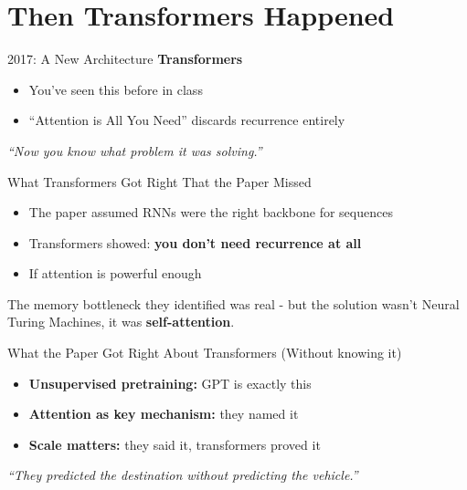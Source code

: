 \section{Then Transformers Happened}

\begin{frame}{2017: A New Architecture}
    \textbf{Transformers}
    
    \vspace{1em}
    \begin{itemize}
        \item You've seen this before in class
        \item ``Attention is All You Need'' discards recurrence entirely
    \end{itemize}
    
    \vspace{1em}
    \textit{``Now you know what problem it was solving.''}
\end{frame}

\begin{frame}{What Transformers Got Right That the Paper Missed}
    \begin{itemize}
        \item The paper assumed RNNs were the right backbone for sequences
        \item Transformers showed: \textbf{you don't need recurrence at all}
        \item If attention is powerful enough
    \end{itemize}
    
    \vspace{1em}
    The memory bottleneck they identified was real - but the solution wasn't Neural Turing Machines, it was \textbf{self-attention}.
\end{frame}

\begin{frame}{What the Paper Got Right About Transformers}
    (Without knowing it)
    
    \vspace{1em}
    \begin{itemize}
        \item \textbf{Unsupervised pretraining:} GPT is exactly this
        \item \textbf{Attention as key mechanism:} they named it
        \item \textbf{Scale matters:} they said it, transformers proved it
    \end{itemize}
    
    \vspace{1em}
    \textit{``They predicted the destination without predicting the vehicle.''}
\end{frame}

